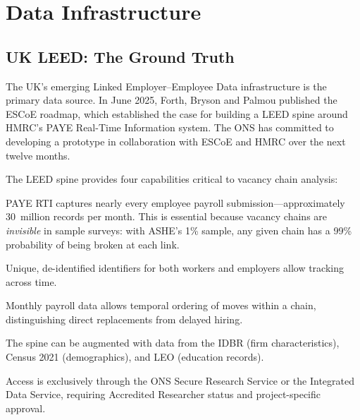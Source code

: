 \documentclass[a4paper]{tufte-handout}
\begin{document}
\section{Data Infrastructure}

\subsection{UK LEED: The Ground Truth}

The UK's emerging Linked Employer--Employee Data infrastructure is the primary data source.
In June 2025, Forth, Bryson and Palmou published the ESCoE roadmap, which established the case for building a LEED spine around HMRC's PAYE Real-Time Information system. The ONS has committed to developing a prototype in collaboration with ESCoE and HMRC over the next twelve months.

The LEED spine provides four capabilities critical to vacancy chain analysis:

\begin{description}[style=nextline, font=\normalfont\itshape]
  \item[Universal coverage]
    PAYE RTI captures nearly every employee payroll submission---approximately 30~million records per month. This is essential because vacancy chains are \emph{invisible} in sample surveys: with ASHE's 1\% sample, any given chain has a 99\% probability of being broken at each link.
  \item[Longitudinal consistency]
    Unique, de-identified identifiers for both workers and employers allow tracking across time.
  \item[High frequency]
    Monthly payroll data allows temporal ordering of moves within a chain, distinguishing direct replacements from delayed hiring.
  \item[Linkability]
    The spine can be augmented with data from the IDBR (firm characteristics), Census 2021 (demographics), and LEO (education records).
\end{description}

\noindent
Access is exclusively through the ONS Secure Research Service or the Integrated Data Service, requiring Accredited Researcher status and project-specific approval.
\end{document}
